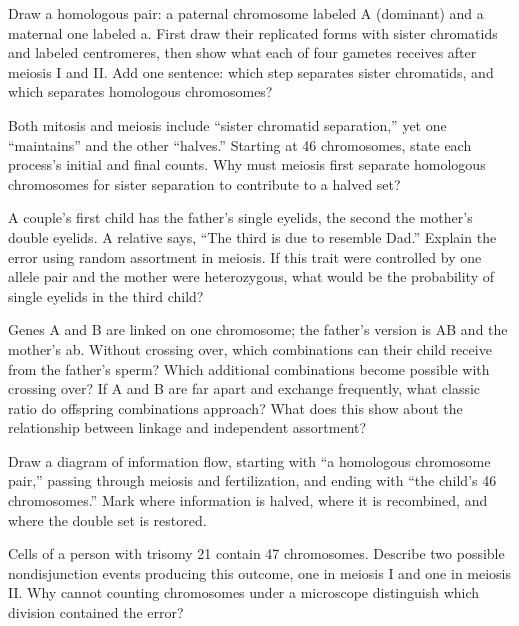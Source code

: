 \begin{sikaoti}
\item Draw a homologous pair: a paternal chromosome labeled A (dominant) and a maternal one labeled a. First draw their replicated forms with sister chromatids and labeled centromeres, then show what each of four gametes receives after meiosis I and II. Add one sentence: which step separates sister chromatids, and which separates homologous chromosomes?
\item Both mitosis and meiosis include ``sister chromatid separation,'' yet one ``maintains'' and the other ``halves.'' Starting at 46 chromosomes, state each process's initial and final counts. Why must meiosis first separate homologous chromosomes for sister separation to contribute to a halved set?
\item A couple's first child has the father's single eyelids, the second the mother's double eyelids. A relative says, ``The third is due to resemble Dad.'' Explain the error using random assortment in meiosis. If this trait were controlled by one allele pair and the mother were heterozygous, what would be the probability of single eyelids in the third child?
\item Genes A and B are linked on one chromosome; the father's version is AB and the mother's ab. Without crossing over, which combinations can their child receive from the father's sperm? Which additional combinations become possible with crossing over? If A and B are far apart and exchange frequently, what classic ratio do offspring combinations approach? What does this show about the relationship between linkage and independent assortment?
\item Draw a diagram of information flow, starting with ``a homologous chromosome pair,'' passing through meiosis and fertilization, and ending with ``the child's 46 chromosomes.'' Mark where information is halved, where it is recombined, and where the double set is restored.
\item Cells of a person with trisomy 21 contain 47 chromosomes. Describe two possible nondisjunction events producing this outcome, one in meiosis I and one in meiosis II. Why cannot counting chromosomes under a microscope distinguish which division contained the error?
\end{sikaoti}
